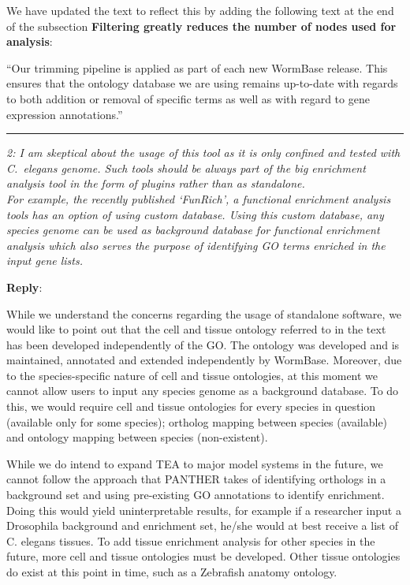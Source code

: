 \documentclass[12pt,stdletter,orderfromtodate,sigleft]{newlfm}
\newcommand{\pointRaised}[2]{\medskip \hrule \noindent 
                \textsl{{\fontseries{b} #1}: #2}}
\newcommand{\reply}{\noindent \textbf{Reply}:\ }
\begin{document}
\begin{newlfm}
{We have updated the text to reflect this by adding the following text at the end of the subsection \textbf{Filtering greatly reduces the number of nodes used for analysis}:

``Our trimming pipeline is applied as part of each new WormBase release. This ensures that the ontology database we are using remains up-to-date with regards to both addition or removal of specific terms as well as with regard to gene expression annotations.''

}

\pointRaised{2}{I am skeptical about the usage of this tool as it is only confined and tested with \emph{C.~elegans} genome. Such tools should be always part of the big enrichment analysis tool in the form of plugins rather than as standalone.\\
For example, the recently published `FunRich', a functional enrichment analysis tools has an option of using custom database. Using this custom database, any species genome can be used as background database for functional enrichment analysis which also serves the purpose of identifying GO terms enriched in the input gene lists. 
}

\reply{While we understand the concerns regarding the usage of standalone software, we would like to point out that the cell and tissue ontology referred to in the text has been developed independently of the GO. The ontology was developed and is maintained, annotated and extended independently by WormBase. Moreover, due to the species-specific nature of cell and tissue ontologies, at this moment we cannot allow users to input any species genome as a background database. To do this, we would require cell and tissue ontologies for every species in question (available only for some species); ortholog mapping between species (available) and ontology mapping between species (non-existent).

While we do intend to expand TEA to major model systems in the future, we cannot follow the approach that PANTHER takes of identifying orthologs in a background set and using pre-existing GO annotations to identify enrichment. Doing this would yield uninterpretable results, for example if a researcher input a Drosophila background and enrichment set, he/she would at best receive a list of C. elegans tissues. To add tissue enrichment analysis for other species in the future, more cell and tissue ontologies must be developed. Other tissue ontologies do exist at this point in time, such as a Zebrafish anatomy ontology.
}


\end{newlfm}
\end{document}
